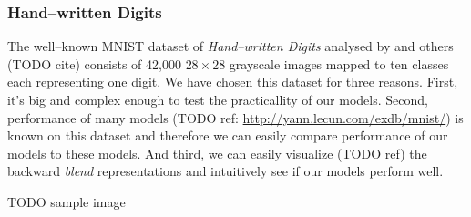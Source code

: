 \subsubsection{Hand--written Digits} 
\label{sec:datasets-digits} 

The well--known MNIST dataset of \emph{Hand--written Digits} analysed by \citet{lecun1998gradient} and others (TODO cite) consists of 42,000 $28 \times 28$ grayscale images mapped to ten classes each representing one digit. We have chosen this dataset for three reasons. First, it's big and complex enough to test the practicallity of our models. Second, performance of many models (TODO ref: \url{http://yann.lecun.com/exdb/mnist/}) is known on this dataset and therefore we can easily compare performance of our models to these models. And third, we can easily visualize (TODO ref) the backward \emph{blend} representations and intuitively see if our models perform well. 

TODO sample image 


